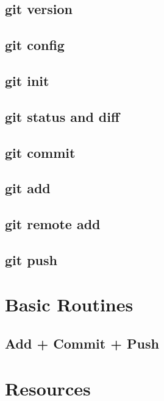 \documentclass[
]{book}
\begin{document}
\hypertarget{git-version}{%
\subsection{git version}\label{git-version}}

\hypertarget{git-config}{%
\subsection{git config}\label{git-config}}

\hypertarget{git-init}{%
\subsection{git init}\label{git-init}}

\hypertarget{git-status-and-diff}{%
\subsection{git status and diff}\label{git-status-and-diff}}

\hypertarget{git-commit}{%
\subsection{git commit}\label{git-commit}}

\hypertarget{git-add}{%
\subsection{git add}\label{git-add}}

\hypertarget{git-remote-add}{%
\subsection{git remote add}\label{git-remote-add}}

\hypertarget{git-push}{%
\subsection{git push}\label{git-push}}

\hypertarget{basic-routines}{%
\section{Basic Routines}\label{basic-routines}}

\hypertarget{add-commit-push}{%
\subsection{Add + Commit + Push}\label{add-commit-push}}

\hypertarget{resources}{%
\section{Resources}\label{resources}}

  
\end{document}
